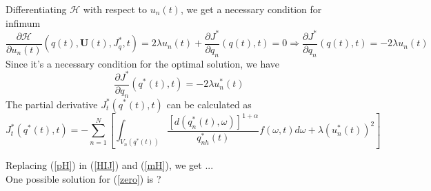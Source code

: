 \documentclass[smallabstract,smallcaptions]{dccpaper}
\newcommand{\bU}{\mathbf{U}}
\newcommand{\bQ}{\ensuremath{q}}          %
\begin{document}
Differentiating $\mathcal{H}$ with respect to $u_n(t)$, we get a necessary condition for infimum
\begin{equation}
\frac{\partial\mathcal{H}}{\partial u_n(t)}\left(\bQ(t),\bU(t),J^*_{\bQ},t\right)=2\lambda u_n(t)+\frac{\partial J^*}{\partial q_n}\left(\bQ(t), t\right)=0 \Rightarrow \frac{\partial J^*}{\partial q_n}\left(\bQ(t), t\right)=-2\lambda u_n(t)
\label{pH}
\end{equation}
Since it's a necessary condition for the optimal solution, we have
\begin{equation}
\frac{\partial J^*}{\partial q_n}\left(\bQ^*(t), t\right)=-2\lambda u^*_n(t)
\end{equation}
The partial derivative $J^*_{t}\left(\bQ^*(t), t\right)$ can be calculated as
\begin{equation}
J^*_{t}\left(\bQ^*(t), t\right)=-\sum_{n=1}^{N}\left[\int_{V_n\left(\bQ^*(t)\right)}\!\!\!\!\frac{\left[d\left(q^*_n(t),\omega\right)\right]^{1+\alpha}}{q^*_{nh}\left(t\right)}f\left(\omega,t\right)d\omega + \lambda \left(u^*_n(t)\right)^2 \right]
\end{equation}

Replacing (\ref{pH}) in (\ref{HIJ}) and (\ref{mH}), we get ...\\
%
One possible solution for (\ref{zero}) is ?\\
%

{\color{red}{To be continued ...}}
\end{document}

